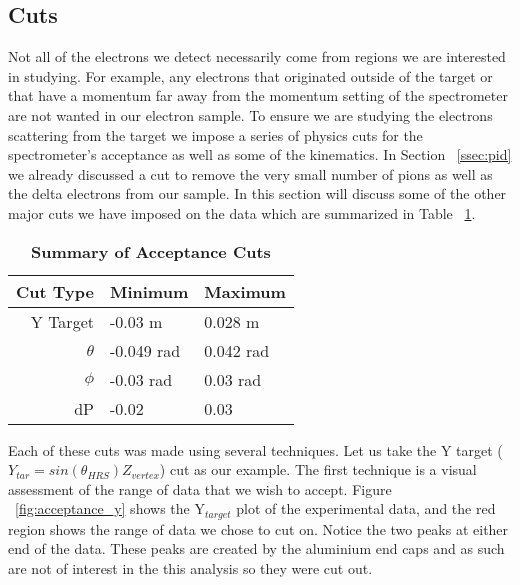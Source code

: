 
\subsection{Cuts}
\label{ssec:cuts}

Not all of the electrons we detect necessarily come from regions we are interested in studying. For example, any electrons that originated outside of the target or that have a momentum far away from the momentum setting of the spectrometer are not wanted in our electron sample. To ensure we are studying the electrons scattering from the target we impose a series of physics cuts for the spectrometer's acceptance as well as some of the kinematics. In Section ~\ref{ssec:pid} we already discussed a cut to remove the very small number of pions as well as the delta electrons from our sample. In this section will discuss some of the other major cuts we have imposed on the data which are summarized in Table ~\ref{tab:cuts}. 

\begin{table}[!h]
\centering
\begin{tabular}{|r | l l|}
\hline
\textbf{Cut Type} & \textbf{Minimum} & \textbf{Maximum}\\
\hline
Y Target & -0.03 m & 0.028 m\\ 
$\theta$ & -0.049 rad & 0.042 rad\\ 
$\phi$ & -0.03 rad & 0.03 rad\\ 
dP & -0.02 & 0.03\\ 
\hline
\end{tabular}
\caption{{\bf{Summary of Acceptance Cuts}} }
\label{tab:cuts}
\end{table}

Each of these cuts was made using several techniques. Let us take the Y target ($Y_{tar}=sin\left(\theta_{HRS}\right)Z_{vertex}$) cut as our example. The first technique is a visual assessment of the range of data that we wish to accept. Figure ~\ref{fig:acceptance_y} shows the Y$_{target}$ plot of the experimental data, and the red region shows the range of data we chose to cut on. Notice the two peaks at either end of the data. These peaks are created by the aluminium end caps and as such are not of interest in the this analysis so they were cut out. 

